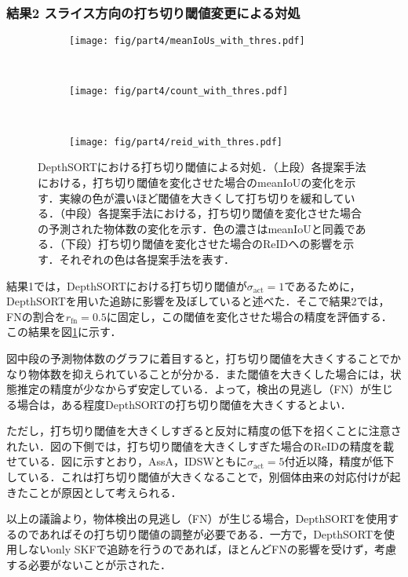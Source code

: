         \subsubsection{結果2 スライス方向の打ち切り閾値変更による対処}

        \begin{figure}[t]
            \begin{subfigure}[t]{\linewidth}
                \centering
                \texttt{[image: fig/part4/meanIoUs\_with\_thres.pdf]}
            \end{subfigure}
            \\
            \begin{subfigure}[t]{\linewidth}
                \centering
                \texttt{[image: fig/part4/count\_with\_thres.pdf]}
            \end{subfigure}
            \\
            \begin{subfigure}[t]{\linewidth}
                \centering
                \texttt{[image: fig/part4/reid\_with\_thres.pdf]}
            \end{subfigure}
            \caption[DepthSORTにおける打ち切り閾値による対処]{DepthSORTにおける打ち切り閾値による対処．（上段）各提案手法における，打ち切り閾値を変化させた場合のmeanIoUの変化を示す．実線の色が濃いほど閾値を大きくして打ち切りを緩和している．（中段）各提案手法における，打ち切り閾値を変化させた場合の予測された物体数の変化を示す．色の濃さはmeanIoUと同義である．（下段）打ち切り閾値を変化させた場合のReIDへの影響を示す．それぞれの色は各提案手法を表す．}
            \label{fig:handling_with_thres}
        \end{figure}

        結果1では，DepthSORTにおける打ち切り閾値が$\sigma_{\text{act}} = 1$であるために，DepthSORTを用いた追跡に影響を及ぼしていると述べた．そこで結果2では，FNの割合を$r_{\text{fn}} = 0.5$に固定し，この閾値を変化させた場合の精度を評価する．この結果を図\ref{fig:handling_with_thres}に示す．

        図中段の予測物体数のグラフに着目すると，打ち切り閾値を大きくすることでかなり物体数を抑えられていることが分かる．また閾値を大きくした場合には，状態推定の精度が少なからず安定している．よって，検出の見逃し（FN）が生じる場合は，ある程度DepthSORTの打ち切り閾値を大きくするとよい．

        ただし，打ち切り閾値を大きくしすぎると反対に精度の低下を招くことに注意されたい．図の下側では，打ち切り閾値を大きくしすぎた場合のReIDの精度を載せている．図に示すとおり，AssA，IDSWともに$\sigma_{\text{act}} = 5$付近以降，精度が低下している．これは打ち切り閾値が大きくなることで，別個体由来の対応付けが起きたことが原因として考えられる．

        以上の議論より，物体検出の見逃し（FN）が生じる場合，DepthSORTを使用するのであればその打ち切り閾値の調整が必要である．一方で，DepthSORTを使用しないonly SKFで追跡を行うのであれば，ほとんどFNの影響を受けず，考慮する必要がないことが示された．

